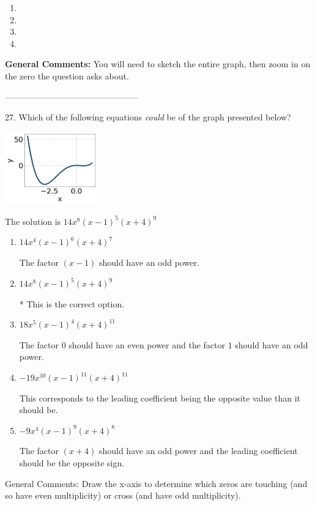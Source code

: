 \documentclass{extbook}[14pt]
\begin{document}
\begin{enumerate}[label=\Alph*.] 
\item   
\item   
\item   
\item   
\end{enumerate} 
 
\textbf{General Comments:} You will need to sketch the entire graph, then zoom in on the zero the question asks about.

-----------------------------------------------

27. Which of the following equations \textit{could} be of the graph presented below?
\begin{center} \includegraphics[width=0.3\textwidth]{../Figures/polyGraphToFunctionA.png} \end{center} 

The solution is $ 14x^{8} (x - 1)^{5} (x + 4)^{9} $ 

\begin{enumerate}[label=\Alph*.] 
\item $ 14x^{4} (x - 1)^{6} (x + 4)^{7} $ 

 The factor $(x - 1)$ should have an odd power. 
\item $ 14x^{8} (x - 1)^{5} (x + 4)^{9} $ 

 * This is the correct option. 
\item $ 18x^{5} (x - 1)^{4} (x + 4)^{11} $ 

 The factor $0$ should have an even power and the factor $1$ should have an odd power. 
\item $ -19x^{10} (x - 1)^{11} (x + 4)^{11} $ 

 This corresponds to the leading coefficient being the opposite value than it should be. 
\item $ -9x^{4} (x - 1)^{9} (x + 4)^{8} $ 

 The factor $(x + 4)$ should have an odd power and the leading coefficient should be the opposite sign. 
\end{enumerate} 
 
General Comments: Draw the x-axis to determine which zeros are touching (and so have even multiplicity) or cross (and have odd multiplicity).
\end{document}
